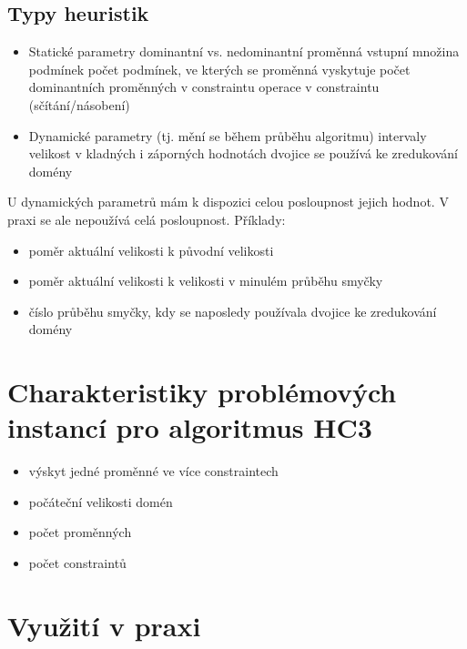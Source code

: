 \subsection{Typy heuristik}

\begin{itemize}
  \item Statické parametry
    \subitem dominantní vs. nedominantní proměnná
    \subitem vstupní množina podmínek
        \subsubitem počet podmínek, ve kterých se proměnná vyskytuje
        \subsubitem počet dominantních proměnných v constraintu
        \subsubitem operace v constraintu (sčítání/násobení)
  \item Dynamické parametry (tj. mění se během průběhu algoritmu)
    \subitem intervaly
        \subsubitem velikost
        \subsubitem v kladných i záporných hodnotách
    \subitem dvojice se používá ke zredukování domény
\end{itemize}

U dynamických parametrů mám k dispozici celou posloupnost jejich hodnot. V praxi se ale nepoužívá celá posloupnost. Příklady:

\begin{itemize}
  \item poměr aktuální velikosti k původní velikosti
  \item poměr aktuální velikosti k velikosti v minulém průběhu smyčky
  \item číslo průběhu smyčky, kdy se naposledy používala dvojice ke zredukování domény
\end{itemize}





\section{Charakteristiky problémových instancí pro algoritmus HC3}
\begin{itemize}
  \item výskyt jedné proměnné ve více constraintech
  \item počáteční velikosti domén
  \item počet proměnných
  \item počet constraintů
\end{itemize}


\section{Využití v praxi}